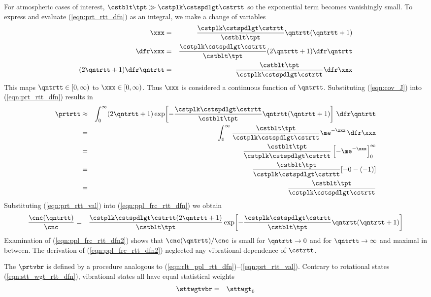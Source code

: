 \documentclass[12pt]{article}
\begin{document}
For atmospheric cases of interest, 
$\cstblt \tpt \gg \cstplk \cstspdlgt \cstrtt$
so the exponential term becomes vanishingly small.
To express and evaluate (\ref{eqn:prt_rtt_dfn}) as an integral,
we make a change of variables 
\begin{eqnarray}
\xxx & = & \frac{\cstplk \cstspdlgt \cstrtt}{\cstblt \tpt} \qntrtt (\qntrtt + 1) \nonumber \\
\dfr\xxx & = & \frac{\cstplk \cstspdlgt \cstrtt}{\cstblt \tpt} (2\qntrtt + 1) \dfr\qntrtt \nonumber \\
(2\qntrtt + 1) \dfr\qntrtt & = & \frac{\cstblt \tpt}{\cstplk \cstspdlgt \cstrtt} \dfr\xxx
\label{eqn:cov_J}
\end{eqnarray}
This maps $\qntrtt \in [0,\infty)$ to $\xxx \in [0,\infty)$.
Thus $\xxx$ is considered a continuous function of $\qntrtt$.
Substituting (\ref{eqn:cov_J}) into (\ref{eqn:prt_rtt_dfn}) results in 
\begin{eqnarray}
\prtrtt & \approx & 
\int_{0}^{\infty} (2\qntrtt + 1)
\exp\! \left[
-\frac{\cstplk \cstspdlgt \cstrtt}{\cstblt \tpt}
\qntrtt ( \qntrtt + 1 ) \right] \,\dfr\qntrtt \nonumber \\
& = & 
\int_{0}^{\infty} 
\frac{\cstblt \tpt}{\cstplk \cstspdlgt \cstrtt}
\me^{-\xxx} \,\dfr\xxx \nonumber \\
& = & 
\frac{\cstblt \tpt}{\cstplk \cstspdlgt \cstrtt} \left[ -\me^{-\xxx} \right]_{0}^{\infty} \nonumber \\
& = & 
\frac{\cstblt \tpt}{\cstplk \cstspdlgt \cstrtt} [ - 0 - ( - 1 ) ] \nonumber \\
& = & 
\frac{\cstblt \tpt}{\cstplk \cstspdlgt \cstrtt}
\label{eqn:prt_rtt_val}
\end{eqnarray}
Substituting (\ref{eqn:prt_rtt_val}) into (\ref{eqn:ppl_frc_rtt_dfn})
we obtain
\begin{eqnarray}
\frac{\cnc(\qntrtt)}{\cnc} & = & 
\frac{\cstplk \cstspdlgt \cstrtt(2\qntrtt + 1)}{\cstblt \tpt}
\exp\! \left[
-\frac{\cstplk \cstspdlgt \cstrtt}{\cstblt \tpt}
\qntrtt ( \qntrtt + 1 ) \right]
\label{eqn:ppl_frc_rtt_dfn2}
\end{eqnarray}
Examination of (\ref{eqn:ppl_frc_rtt_dfn2}) shows that
$\cnc(\qntrtt)/\cnc$ is small for $\qntrtt \rightarrow 0$ and 
for $\qntrtt \rightarrow \infty$ and maximal in between.
The derivation of (\ref{eqn:ppl_frc_rtt_dfn2}) neglected any
vibrational-dependence of $\cstrtt$.

The  $\prtvbr$ is defined by a
procedure analogous to
(\ref{eqn:rlt_ppl_rtt_dfn})--(\ref{eqn:prt_rtt_val}).
Contrary to rotational states (\ref{eqn:stt_wgt_rtt_dfn}), vibrational
states all have equal statistical weights
\begin{eqnarray}
\sttwgtvbr & = & \sttwgt_{0}
\label{eqn:stt_wgt_vbr_dfn}
\end{eqnarray}
\end{document}
